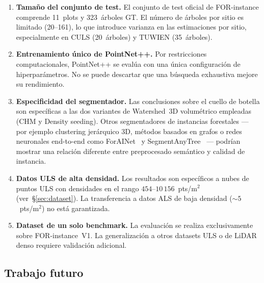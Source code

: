 \documentclass[runningheads]{llncs}
\begin{document}
\begin{enumerate}
  \item \textbf{Tama\~no del conjunto de test.} El conjunto de test oficial de FOR-instance comprende 11~plots y 323~\'arboles GT. El n\'umero de \'arboles por sitio es limitado (20--161), lo que introduce varianza en las estimaciones por sitio, especialmente en CULS (20~\'arboles) y TUWIEN (35~\'arboles).

  \item \textbf{Entrenamiento \'unico de PointNet++.} Por restricciones computacionales, PointNet++ se eval\'ua con una \'unica configuraci\'on de hiperpar\'ametros. No se puede descartar que una b\'usqueda exhaustiva mejore su rendimiento.

  \item \textbf{Especificidad del segmentador.} Las conclusiones sobre el cuello de botella son espec\'ificas a las dos variantes de Watershed~3D volum\'etrico empleadas (CHM y Density seeding). Otros segmentadores de instancias forestales --- por ejemplo clustering jer\'arquico 3D, m\'etodos basados en grafos o redes neuronales end-to-end como ForAINet~\cite{henrich2024} y SegmentAnyTree~\cite{wielgosz2024} --- podr\'ian mostrar una relaci\'on diferente entre preprocesado sem\'antico y calidad de instancia.

  \item \textbf{Datos ULS de alta densidad.} Los resultados son espec\'ificos a nubes de puntos ULS con densidades en el rango $454$--$10\,156$~pts/m$^2$ (ver~\S\ref{sec:dataset}). La transferencia a datos ALS de baja densidad (${\sim}5$~pts/m$^2$) no est\'a garantizada.

  \item \textbf{Dataset de un solo benchmark.} La evaluaci\'on se realiza exclusivamente sobre FOR-instance~V1. La generalizaci\'on a otros datasets ULS o de LiDAR denso requiere validaci\'on adicional.
\end{enumerate}

\subsection{Trabajo futuro}
\end{document}
